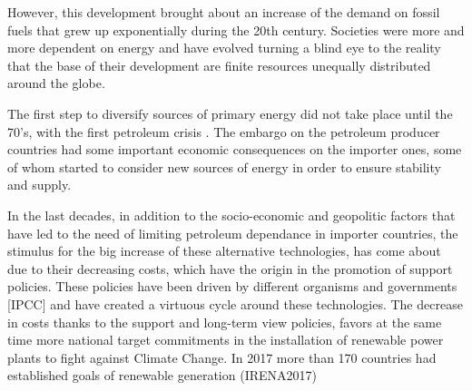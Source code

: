 However, this development brought about an increase of the demand on fossil fuels that grew up exponentially during the 20th century. Societies were more and more dependent on energy and have evolved turning a blind eye to the reality that the base of their development are finite resources unequally distributed around the globe.


The first step to diversify sources of primary energy did not take place until the 70's, with the first petroleum crisis \cite*{Sorensen1991}. The embargo on the petroleum producer countries had some important economic consequences on the importer ones, some of whom started to consider new sources of energy in order to ensure stability and supply.



In the last decades, in addition to the socio-economic and geopolitic factors that have led to the need of limiting petroleum dependance in importer countries, the stimulus for the big increase of these alternative technologies, has come about due to their decreasing costs, which have the origin in the promotion of support policies. These policies have been driven by different organisms and governments [IPCC] and have created a virtuous cycle around these technologies. The decrease in costs thanks to the support and long-term view policies, favors at the same time more national target commitments in the installation of renewable power plants to fight against Climate Change. In 2017 more than 170 countries had established goals of renewable generation (IRENA2017)

